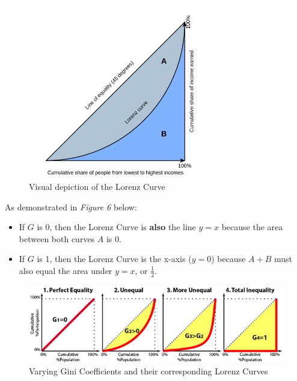\documentclass[
  letterpaper,
  DIV=11,
  numbers=noendperiod]{scrartcl}
\providecommand{\tightlist}{%
  \setlength{\itemsep}{0pt}\setlength{\parskip}{0pt}}\usepackage{longtable,booktabs,array}
\begin{document}
\begin{figure}[H]

{\centering \includegraphics[width=0.68\textwidth,height=\textheight]{img/lorenz.png}

}

\caption{Visual depiction of the Lorenz Curve}

\end{figure}%

As demonstrated in \emph{Figure 6} below:

\begin{itemize}
\tightlist
\item
  If \(G\) is 0, then the Lorenz Curve is \textbf{also} the line \(y=x\)
  because the area between both curves \(A\) is 0.
\item
  If \(G\) is 1, then the Lorenz Curve is the x-axis (\(y=0\)) because
  \(A+B\) must also equal the area under \(y=x\), or \(\frac{1}{2}\).
\end{itemize}

\begin{figure}[H]

{\centering \includegraphics[width=1\textwidth,height=\textheight]{img/varying-gini.png}

}

\caption{Varying Gini Coefficients and their corresponding Lorenz
Curves}

\end{figure}%
\end{document}
